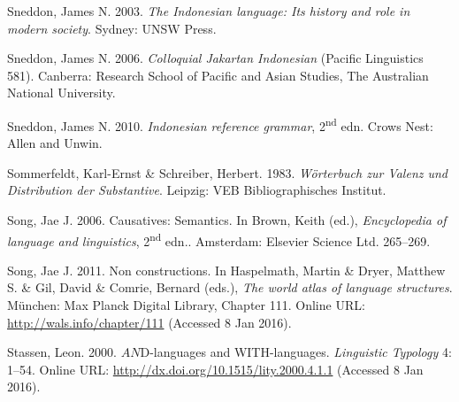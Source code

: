 \begin{styleCitaviBibliographyEntry}
Sneddon, James N. 2003. \textit{The Indonesian language: Its history and role in modern society}. Sydney: UNSW Press.
\end{styleCitaviBibliographyEntry}

\begin{styleCitaviBibliographyEntry}
Sneddon, James N. 2006. \textit{Colloquial Jakartan Indonesian} (Pacific Linguistics 581). Canberra: Research School of Pacific and Asian Studies, The Australian National University.
\end{styleCitaviBibliographyEntry}

\begin{styleCitaviBibliographyEntry}
Sneddon, James N. 2010. \textit{Indonesian reference grammar}, 2\textsuperscript{nd} edn. Crows Nest: Allen and Unwin.
\end{styleCitaviBibliographyEntry}

\begin{styleCitaviBibliographyEntry}
Sommerfeldt, Karl-Ernst \& Schreiber, Herbert. 1983. \textit{Wörterbuch zur Valenz und Distribution der Substantive}. Leipzig: VEB Bibliographisches Institut.
\end{styleCitaviBibliographyEntry}

\begin{styleCitaviBibliographyEntry}
Song, Jae J. 2006. Causatives: Semantics. In Brown, Keith (ed.), \textit{Encyclopedia of language and linguistics}, 2\textsuperscript{nd} edn.. Amsterdam: Elsevier Science Ltd. 265–269.
\end{styleCitaviBibliographyEntry}

\begin{styleCitaviBibliographyEntry}
Song, Jae J. 2011. Non constructions. In Haspelmath, Martin \& Dryer, Matthew S. \& Gil, David \& Comrie, Bernard (eds.), \textit{The world atlas of language structures}. München: Max Planck Digital Library, Chapter 111. Online URL: \url{http://wals.info/chapter/111} (Accessed 8 Jan 2016).
\end{styleCitaviBibliographyEntry}

\begin{styleCitaviBibliographyEntry}
Stassen, Leon. 2000. $AN$D-languages and WITH-languages. \textit{Linguistic Typology} 4: 1–54. Online URL: \url{http://dx.doi.org/10.1515/lity.2000.4.1.1} (Accessed 8 Jan 2016).
\end{styleCitaviBibliographyEntry}

